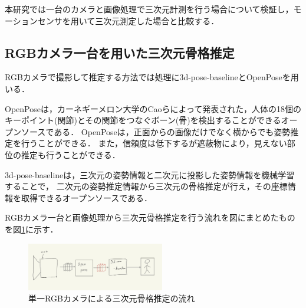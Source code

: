\documentclass[titlepage]{jarticle}
\begin{document}
本研究では一台のカメラと画像処理で三次元計測を行う場合について検証し，モーションセンサを用いて三次元測定した場合と比較する．

%
%
\subsection{RGBカメラ一台を用いた三次元骨格推定}
%
RGBカメラで撮影して推定する方法では処理に3d-pose-baseline\cite{baseline}とOpenPose\cite{openpose}を用いる．

OpenPoseは，カーネギーメロン大学のCaoらによって発表された，人体の18個のキーポイント(関節)とその関節をつなぐボーン(骨)を検出することができるオープンソースである．
OpenPoseは，正面からの画像だけでなく横からでも姿勢推定を行うことができる．
また，信頼度は低下するが遮蔽物により，見えない部位の推定も行うことができる．

3d-pose-baselineは，三次元の姿勢情報と二次元に投影した姿勢情報を機械学習することで，
二次元の姿勢推定情報から三次元の骨格推定が行え，その座標情報を取得できるオープンソースである．

RGBカメラ一台と画像処理から三次元骨格推定を行う\cite{ビデオ}流れを図にまとめたものを図\ref{RGB}に示す．

\begin{figure}[t!]
  \centering
  \includegraphics[width=6cm]{img/RGBcamera.jpg}
  \caption{単一RGBカメラによる三次元骨格推定の流れ}
  \label{RGB}
\end{figure}
\end{document}
